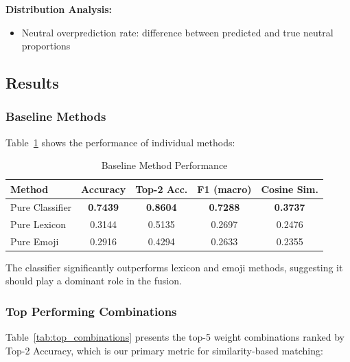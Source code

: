 \textbf{Distribution Analysis:}
\begin{itemize}
    \item Neutral overprediction rate: difference between predicted and true neutral proportions
\end{itemize}

\subsection{Results}
\label{subsec:results}

\subsubsection{Baseline Methods}

Table~\ref{tab:baseline_results} shows the performance of individual methods:

\begin{table}[h]
\centering
\caption{Baseline Method Performance}
\label{tab:baseline_results}
\begin{tabular}{lcccc}
\toprule
Method & Accuracy & Top-2 Acc. & F1 (macro) & Cosine Sim. \\
\midrule
Pure Classifier & \textbf{0.7439} & \textbf{0.8604} & \textbf{0.7288} & \textbf{0.3737} \\
Pure Lexicon & 0.3144 & 0.5135 & 0.2697 & 0.2476 \\
Pure Emoji & 0.2916 & 0.4294 & 0.2633 & 0.2355 \\
\bottomrule
\end{tabular}
\end{table}

The classifier significantly outperforms lexicon and emoji methods, suggesting it should play a dominant role in the fusion.

\subsubsection{Top Performing Combinations}

Table~\ref{tab:top_combinations} presents the top-5 weight combinations ranked by Top-2 Accuracy, which is our primary metric for similarity-based matching:

